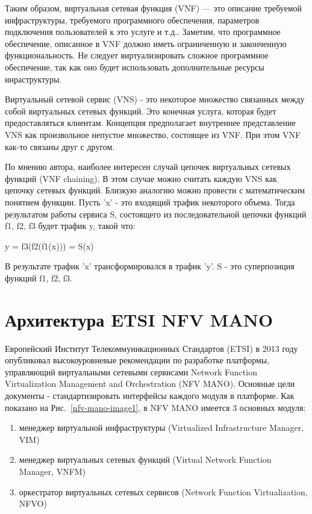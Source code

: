 \documentclass[oneside,final,14pt,a4paper]{extreport}
\begin{document}
Таким образом, виртуальная сетевая функция (VNF) --- это описание требуемой инфраструктуры, требуемого программного обеспечения, параметров подключения пользователей к это услуге и т.д.. Заметим, что программное обеспечение, описанное в VNF должно иметь ограниченную и законченную функциональность. Не следует виртуализировать сложное программное обеспечение, так как оно будет использовать дополнительные ресурсы инраструктуры.

Виртуальный сетевой сервис (VNS) - это некоторое множество связанных между собой виртуальных сетевых функций. Это конечная услуга, которая будет предоставляться клиентам. Концепция предполагает внутреннее представление VNS как произвольное непустое множество, состоящее из VNF. При этом VNF как-то связаны друг с другом.

По мнению автора, наиболее интересен случай цепочек виртуальных сетевых функций (VNF chaining). В этом случае можно считать каждую VNS как цепочку сетевых функций. Близкую аналогию можно провести с математическим понятием функции. Пусть 'x' - это входящий трафик некоторого объема. Тогда результатом работы сервиса S, состоящего из последовательной цепочки функций f1, f2, f3 будет трафик y, такой что:

y = f3(f2(f1(x))) = S(x)

В результате трафик 'x' трансформировался в трафик 'y'. S - это суперпозиция функций f1, f2, f3.

\section{Архитектура ETSI NFV MANO}
Европейский Институт Телекоммуникационных Стандартов (ETSI) в 2013 году опубликовал высокоуровневые рекомендации по разработке платформы, управляющий виртуальными сетевыми сервисами Network Function Virtualization Management and Orchestration (NFV MANO). Основные цели документы - стандартизировать интерфейсы каждого модуля в платформе.\cite{nfv-mano-state1} Как показано на Рис.~\ref{nfv-mano-image1}, в NFV MANO имеется 3 основных модуля:

\begin{enumerate}
	\item менеджер виртуальной инфраструктуры (Virtualized Infrastructure Manager, VIM)
	\item менеджер виртуальных сетевых функций (Virtual Network Function Manager, VNFM)
	\item оркестратор виртуальных сетевых сервисов (Network Function Virtualization, NFVO)
\end{enumerate}
\end{document}
